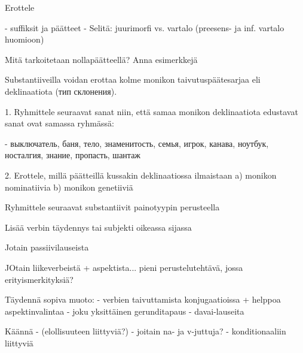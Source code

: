 
Erottele

- suffiksit ja päätteet
- Selitä: juurimorfi vs. vartalo (preesens- ja inf. vartalo huomioon)

Mitä tarkoitetaan nollapäätteellä? Anna esimerkkejä

Substantiiveilla voidan erottaa kolme monikon taivutuspäätesarjaa eli deklinaatiota (тип склонения). 

1. Ryhmittele seuraavat sanat niin, että samaa monikon deklinaatiota edustavat sanat ovat samassa ryhmässä:

- выключатель, баня, тело, знаменитость, семья, игрок, канава, ноутбук, носталгия, знание, пропасть, шантаж

2. Erottele, millä päätteillä kussakin deklinaatiossa ilmaistaan a) monikon nominatiivia b) monikon genetiiviä

Ryhmittele seuraavat substantiivit painotyypin perusteella

Lisää verbin täydennys tai subjekti oikeassa sijassa

Jotain passiivilauseista

JOtain liikeverbeistä + aspektista... pieni perustelutehtävä, jossa erityismerkityksiä?



Täydennä sopiva muoto:
    - verbien taivuttamista konjugaatioissa + helppoa aspektinvalintaa
    - joku yksittäinen gerunditapaus
    - davai-lauseita

Käännä 
    - (elollisuuteen liittyviä?)
    - joitain na- ja v-juttuja?
    - konditionaaliin liittyviä
